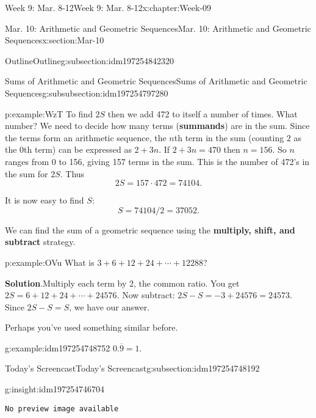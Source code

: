 \documentclass[oneside,10pt,]{book}
\newcommand{\blocktitlefont}{\relax}
\newcommand{\mono}[1]{\texttt{#1}}
\newcommand{\terminology}[1]{\textbf{#1}}
\numberwithin{equation}{section}
\newlength{\qrsize}
\newlength{\previewwidth}
\begin{document}
\begin{chapterptx}{Week 9: Mar. 8-12}{}{Week 9: Mar. 8-12}{}{}{x:chapter:Week-09}
\begin{sectionptx}{Mar. 10: Arithmetic and Geometric Sequences}{}{Mar. 10: Arithmetic and Geometric Sequences}{}{}{x:section:Mar-10}
\begin{subsectionptx}{Outline}{}{Outline}{}{}{g:subsection:idm197254842320}
\begin{subsubsectionptx}{Sums of Arithmetic and Geometric Sequences}{}{Sums of Arithmetic and Geometric Sequences}{}{}{g:subsubsection:idm197254797280}
\begin{example}{}{p:example:WzT}
To find \(2S\) then we add 472 to itself a number of times. What number? We need to decide how many terms (\terminology{summands}) are in the sum. Since the terms form an arithmetic sequence, the \(n\)th term in the sum (counting \(2\) as the 0th term) can be expressed as \(2 + 3n\). If \(2 + 3n = 470\) then \(n = 156\). So \(n\) ranges from 0 to 156, giving 157 terms in the sum. This is the number of 472's in the sum for \(2S\). Thus%
\begin{equation*}
2S = 157\cdot 472 = 74104\text{.}
\end{equation*}
%
\par
It is now easy to find \(S\):%
\begin{equation*}
S = 74104/2 = 37052\text{.}
\end{equation*}
%
\end{example}
We can find the sum of a geometric sequence using the \terminology{multiply, shift, and subtract} strategy.%
\begin{example}{}{p:example:OVu}%
What is \(3 + 6 + 12 + 24 + \cdots + 12288\)?%
\par\smallskip%
\noindent\textbf{\blocktitlefont Solution}.\hypertarget{p:solution:msL}{}\quad{}Multiply each term by 2, the common ratio. You get \(2S = 6 + 12 + 24 + \cdots + 24576\). Now subtract: \(2S - S = -3 + 24576 = 24573\). Since \(2S - S = S\), we have our answer.%
\end{example}
Perhaps you've used something similar before.%
\begin{example}{}{g:example:idm197254748752}%
\(0.\overline{9} = 1.\)%
\end{example}
\end{subsubsectionptx}
\end{subsectionptx}
%
%
\typeout{************************************************}
\typeout{************************************************}
%
\begin{subsectionptx}{Today's Screencast}{}{Today's Screencast}{}{}{g:subsection:idm197254748192}
\begin{insight}{}{g:insight:idm197254746704}%
\setlength{\qrsize}{9em}
\setlength{\previewwidth}{\linewidth}
\addtolength{\previewwidth}{-\qrsize}
\begin{tcbraster}[raster columns=2, raster column skip=1pt, raster halign=center, raster force size=false, raster left skip=0pt, raster right skip=0pt]%
\begin{tcolorbox}[previewstyle, width=\previewwidth]%
\mono{No preview image available}%

\end{tcolorbox}
\end{tcbraster}
\end{insight}
\end{subsectionptx}
\end{sectionptx}
\end{chapterptx}
\end{document}
